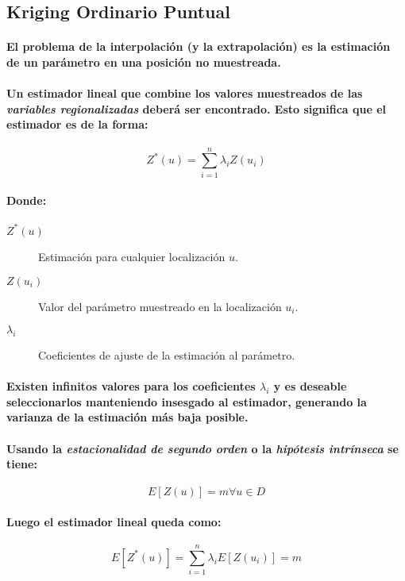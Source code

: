 \subsection{Kriging Ordinario Puntual}
\paragraph{
El problema de la interpolación (y la extrapolación) es la estimación de un parámetro en una posición no muestreada.
}
\paragraph{
Un estimador lineal que combine los valores muestreados de las \emph{variables regiona\-lizadas} deberá ser encontrado. Esto significa que el estimador es de la forma:
}
\begin{equation}
Z^*(u) = \sum_{i=1}^n \lambda_i Z(u_i)
\end{equation}
\paragraph{
Donde:
}
\begin{description}
\item[$Z^*(u)$] Estimación para cualquier localización $u$.
\item[$Z(u_i)$] Valor del parámetro muestreado en la localización $u_i$.
\item[$\lambda_i$] Coeficientes de ajuste de la estimación al parámetro.
\end{description}
\paragraph{
Existen infinitos valores para los coeficientes $\lambda_i$ y es deseable seleccionarlos manteniendo insesgado al estimador, generando la varianza de la estimación más baja posible.
}
\paragraph{
Usando la \emph{estacionalidad de segundo orden} o la \emph{hipótesis intrínseca} se tiene:
}
\begin{equation}
E[Z(u)]=m \forall u \in D
\end{equation}
\paragraph{
Luego el estimador lineal queda como:
}
\begin{equation}
E[Z^*(u)]= \sum_{i=1}^n \lambda_i E[Z(u_i)] = m
\end{equation}
